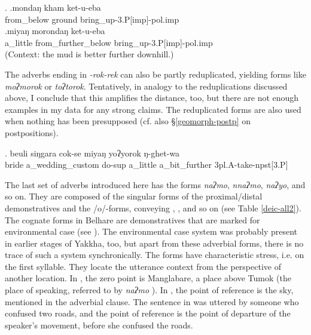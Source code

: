 \ex. \ag.mondaŋ kham ket-u-eba\\
from\_below ground bring\_up{\sc -3.P[imp]-pol.imp}\\
\bg.miyaŋ morondaŋ ket-u-eba\\
a\_little from\_further\_below bring\_up{\sc -3.P[imp]-pol.imp}\\
 (Context: the mud is better further downhill.)

The adverbs ending in \emph{-rok\ti -rek} can also be partly reduplicated, yielding forms like \emph{moʔmorok} or \emph{toʔtorok}. Tentatively, in analogy to the reduplications discussed above, I conclude that this amplifies the distance, too, but there are not enough examples in my data for any strong claims. The reduplicated forms are also  used when nothing has been presupposed (cf. also §\ref{geomorph-postp} on postpositions).
 
\exg.  beuli siŋgara         cok-se         miyaŋ yoʔyorok ŋ-ghet-wa\\
bride a\_wedding\_custom do{\sc -sup} a\_little a\_bit\_further {\sc 3pl.A-}take{\sc -npst[3.P]}\\
 


The last set of adverbs introduced here has  the forms \emph{naʔmo}, \emph{nnaʔmo}, \emph{naʔyo}, and so on. They are composed of the singular forms of the proximal/distal demonstratives and the /o/-forms, conveying , ,  and so on (see Table \ref{deic-all2}).  The cognate forms in Belhare are demonstratives that are marked for environmental case (see \citealt[226-27]{Bickel2001Deictic}). The environmental case system was probably present in earlier stages of Yakkha, too, but apart from these adverbial forms, there is no trace of such a system synchronically. The forms have characteristic stress, i.e. on the first syllable. They locate the utterance context from the perspective of another location. In \Next[a], the zero point is Manglabare, a place above Tumok (the place of speaking, referred to by \emph{naʔmo} ). In \Next[b], the point of reference is the sky, mentioned in the adverbial clause.  The sentence in \Next[c] was uttered by someone who confused two roads, and the point of reference is the point of departure of the speaker's movement, before she confused the roads.

